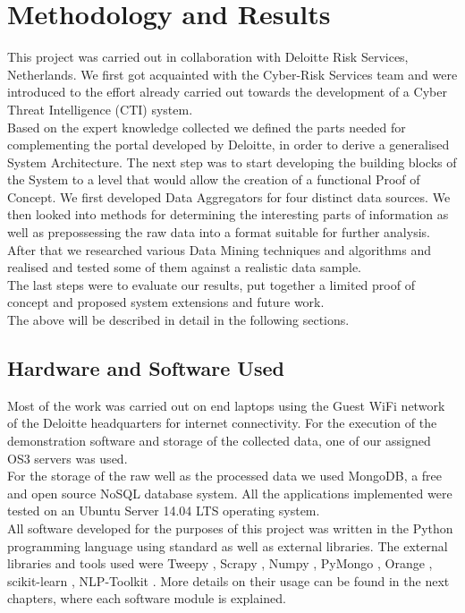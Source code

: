 \documentclass[12pt]{article}
\begin{document}
\newpage
\section{Methodology and Results}
This project was carried out in collaboration with Deloitte Risk Services, Netherlands. We first got acquainted with the Cyber-Risk Services team and were introduced to the effort already carried out towards the development of a Cyber Threat Intelligence (CTI) system. 
\hfill \break \\
Based on the expert knowledge collected we defined the parts needed for complementing the portal developed by Deloitte, in order to derive a generalised System Architecture. The next step was to start developing the building blocks of the System to a level that would allow the creation of a functional Proof of Concept. We first developed Data Aggregators for four distinct data sources. We then looked into methods for determining the interesting parts of information as well as prepossessing the raw data into a format suitable for further analysis. After that we researched various Data Mining techniques and algorithms and realised and tested some of them against a realistic data sample.
\hfill \break \\
The last steps were to evaluate our results, put together a limited proof of concept and proposed system extensions and future work. 
\hfill \break \\
The above will be described in detail in the following sections. 

\subsection{Hardware and Software Used}


Most of the work was carried out on end laptops using the Guest WiFi network of the Deloitte\cite{deloitte} headquarters for internet connectivity. For the execution of the demonstration software and storage of the collected data, one of our assigned OS3 servers was used.
\hfill \break \\
For the storage of the raw well as the processed data we used MongoDB\cite{mongo}, a free and open source NoSQL database system. All the applications implemented were tested on an Ubuntu Server 14.04 LTS \cite{ubuntu-server-14.04} operating system.
\hfill \break \\ 
All software developed for the purposes of this project was written in the Python\cite{python} programming language using standard as well as external libraries. The external libraries and tools used were Tweepy \cite{tweepy}, Scrapy \cite{scrapy}, Numpy \cite{numpy}, PyMongo \cite{pymongo}, Orange \cite{orange}, scikit-learn \cite{sklearn}, NLP-Toolkit \cite{nltk}. More details on their usage can be found in the next chapters, where each software module is explained.
\end{document}
